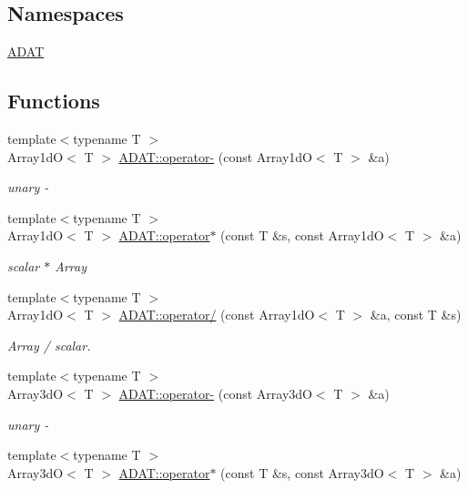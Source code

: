 \subsection*{Namespaces}
\begin{DoxyCompactItemize}
\item 
 \mbox{\hyperlink{namespaceADAT}{A\+D\+AT}}
\end{DoxyCompactItemize}
\subsection*{Functions}
\begin{DoxyCompactItemize}
\item 
{\footnotesize template$<$typename T $>$ }\\Array1dO$<$ T $>$ \mbox{\hyperlink{namespaceADAT_a38346a215cc728771b946bbdaa59e62f}{A\+D\+A\+T\+::operator-\/}} (const Array1dO$<$ T $>$ \&a)
\begin{DoxyCompactList}\small\item\em unary -\/ \end{DoxyCompactList}\item 
{\footnotesize template$<$typename T $>$ }\\Array1dO$<$ T $>$ \mbox{\hyperlink{namespaceADAT_af3b34c2746ded9a7804cc7f35945a02e}{A\+D\+A\+T\+::operator$\ast$}} (const T \&s, const Array1dO$<$ T $>$ \&a)
\begin{DoxyCompactList}\small\item\em scalar $\ast$ Array \end{DoxyCompactList}\item 
{\footnotesize template$<$typename T $>$ }\\Array1dO$<$ T $>$ \mbox{\hyperlink{namespaceADAT_a32b40ea36b55f2b40457eb0c0ad63d90}{A\+D\+A\+T\+::operator/}} (const Array1dO$<$ T $>$ \&a, const T \&s)
\begin{DoxyCompactList}\small\item\em Array / scalar. \end{DoxyCompactList}\item 
{\footnotesize template$<$typename T $>$ }\\Array3dO$<$ T $>$ \mbox{\hyperlink{namespaceADAT_a891c59cca15a986469283c3b0c8c8b9f}{A\+D\+A\+T\+::operator-\/}} (const Array3dO$<$ T $>$ \&a)
\begin{DoxyCompactList}\small\item\em unary -\/ \end{DoxyCompactList}\item 
{\footnotesize template$<$typename T $>$ }\\Array3dO$<$ T $>$ \mbox{\hyperlink{namespaceADAT_aef364bd88d427d6a56a11f3201cbfaca}{A\+D\+A\+T\+::operator$\ast$}} (const T \&s, const Array3dO$<$ T $>$ \&a)

\end{DoxyCompactItemize}
